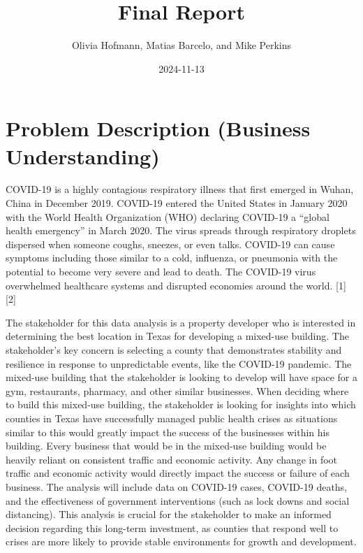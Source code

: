 \documentclass[
]{article}
\title{Final Report}
\author{Olivia Hofmann, Matias Barcelo, and Mike Perkins}
\date{2024-11-13}
\begin{document}
\maketitle

{
\setcounter{tocdepth}{4}
\tableofcontents
}
\newpage

\section{Problem Description (Business
Understanding)}\label{problem-description-business-understanding}

COVID-19 is a highly contagious respiratory illness that first emerged
in Wuhan, China in December 2019. COVID-19 entered the United States in
January 2020 with the World Health Organization (WHO) declaring COVID-19
a ``global health emergency'' in March 2020. The virus spreads through
respiratory droplets dispersed when someone coughs, sneezes, or even
talks. COVID-19 can cause symptoms including those similar to a cold,
influenza, or pneumonia with the potential to become very severe and
lead to death. The COVID-19 virus overwhelmed healthcare systems and
disrupted economies around the world. {[}1{]} {[}2{]}

The stakeholder for this data analysis is a property developer who is
interested in determining the best location in Texas for developing a
mixed-use building. The stakeholder's key concern is selecting a county
that demonstrates stability and resilience in response to unpredictable
events, like the COVID-19 pandemic. The mixed-use building that the
stakeholder is looking to develop will have space for a gym,
restaurants, pharmacy, and other similar businesses. When deciding where
to build this mixed-use building, the stakeholder is looking for
insights into which counties in Texas have successfully managed public
health crises as situations similar to this would greatly impact the
success of the businesses within his building. Every business that would
be in the mixed-use building would be heavily reliant on consistent
traffic and economic activity. Any change in foot traffic and economic
activity would directly impact the success or failure of each business.
The analysis will include data on COVID-19 cases, COVID-19 deaths, and
the effectiveness of government interventions (such as lock downs and
social distancing). This analysis is crucial for the stakeholder to make
an informed decision regarding this long-term investment, as counties
that respond well to crises are more likely to provide stable
environments for growth and development.
\end{document}
